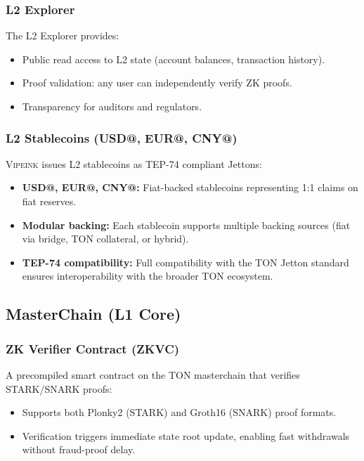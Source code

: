 \documentclass[12pt,a4paper]{article}
\theoremstyle{definition}
\theoremstyle{remark}
\newcommand{\Vipeink}{\textsc{Vipeink}}
\begin{document}
\subsubsection{L2 Explorer}

The L2 Explorer provides:
\begin{itemize}[nosep]
    \item Public read access to L2 state (account balances, transaction history).
    \item Proof validation: any user can independently verify ZK proofs.
    \item Transparency for auditors and regulators.
\end{itemize}

\subsubsection{L2 Stablecoins (USD@, EUR@, CNY@)}

\Vipeink{} issues L2 stablecoins as TEP-74 compliant Jettons:
\begin{itemize}[nosep]
    \item \textbf{USD@, EUR@, CNY@:} Fiat-backed stablecoins representing 1:1 claims on fiat reserves.
    \item \textbf{Modular backing:} Each stablecoin supports multiple backing sources (fiat via bridge, TON collateral, or hybrid).
    \item \textbf{TEP-74 compatibility:} Full compatibility with the TON Jetton standard ensures interoperability with the broader TON ecosystem.
\end{itemize}

\subsection{MasterChain (L1 Core)}
\label{sec:masterchain}

\subsubsection{ZK Verifier Contract (ZKVC)}

A precompiled smart contract on the TON masterchain that verifies STARK/SNARK proofs:
\begin{itemize}[nosep]
    \item Supports both Plonky2 (STARK) and Groth16 (SNARK) proof formats.
    \item Verification triggers immediate state root update, enabling fast withdrawals without fraud-proof delay.
\end{itemize}
\end{document}
